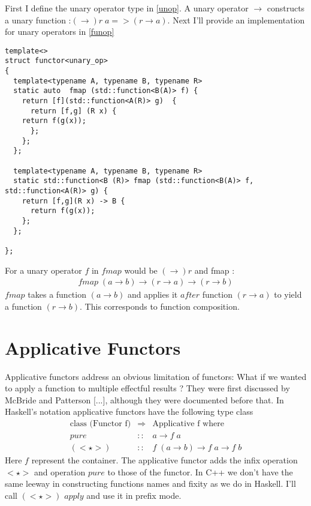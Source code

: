 \documentclass[12pt,fleqn]{article}
\begin{document}
First I define the unary operator type in \ref{unop}.
A unary operator $\rightarrow$ constructs a unary function :$(\rightarrow) r\;a => (r \rightarrow a)$.
Next I'll provide an implementation for unary operators in \ref{funop}

\begin{lstlisting}[caption=functor for unary operators, label=funop]
template<>
struct functor<unary_op>
{
  template<typename A, typename B, typename R>
  static auto  fmap (std::function<B(A)> f) {  
    return [f](std::function<A(R)> g)  {
      return [f,g] (R x) {
	return f(g(x));
      };
    };
  };

  template<typename A, typename B, typename R>
  static std::function<B (R)> fmap (std::function<B(A)> f, std::function<A(R)> g) {  
    return [f,g](R x) -> B {
      return f(g(x));
    };
  };

};
\end{lstlisting}

For a unary operator $f$ in $fmap$  would be $(\rightarrow) r$ and fmap :
\begin{eqnarray*}
fmap \; (a \rightarrow b) \rightarrow (r \rightarrow a) \rightarrow (r \rightarrow b)
\end{eqnarray*}
$fmap$ takes a function $(a\rightarrow b)$ and applies it $after$ function $(r \rightarrow a)$ to yield a function $(r \rightarrow b)$.
This corresponds to function composition.

\section*{Applicative Functors}
Applicative functors address an obvious limitation of functors: What if we wanted to apply a function to multiple effectful results ?
They were first discussed by McBride and Patterson [...], although they were documented before that.
In Haskell's notation applicative functors have the following type class 
\begin{eqnarray*}
\mbox{class (Functor f)} &\Rightarrow& \mbox{Applicative f where} \\
pure  &::& a \rightarrow f\;a \\
(<\star>) &::& f \; ( a \rightarrow b) \rightarrow f \; a \rightarrow f\;b
\end{eqnarray*}
Here $f$ represent the container. 
The applicative functor adds the infix operation $<\star>$ and operation $pure$ to those of the functor.
In C++ we don't have the same leeway in  constructing functions names and fixity as we do in Haskell.
I'll call $(<\star>)$ $apply$ and use it in prefix mode.
\end{document}

